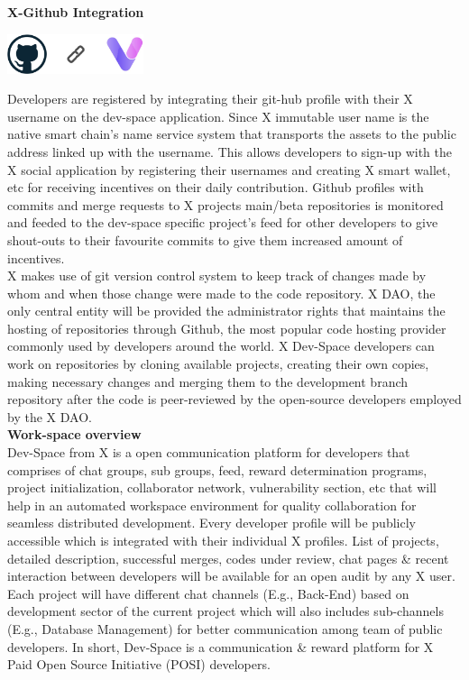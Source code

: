 \documentclass[letterpaper,11pt]{article}
\begin{document}
\textbf{X-Github Integration}\\

\begin{center}
\includegraphics[width=4cm]{git-int}
\end{center}

Developers are registered by integrating their git-hub profile with their X username on the dev-space application. Since X immutable user name is the native smart chain's name service system that transports the assets to the public address linked up with the username. This allows developers to sign-up with the X social application by registering their usernames and creating X smart wallet, etc for receiving incentives on their daily contribution. Github profiles with commits and merge requests to X projects main/beta repositories is monitored and feeded to the dev-space specific project's feed for other developers to give shout-outs to their favourite commits to give them increased amount of incentives.\\

X makes use of git version control system to keep track of changes made by whom and when those change were made to the code repository. X DAO, the only central entity will be provided the administrator rights that maintains the hosting of repositories through Github, the most popular code hosting provider commonly used by developers around the world. X Dev-Space developers can work on repositories by cloning available projects, creating their own copies, making necessary changes and merging them to the development branch repository after the code is peer-reviewed by the open-source developers employed by the X DAO.\\ 

\textbf{Work-space overview}\\

Dev-Space from X is a open communication platform for developers that comprises of chat groups, sub groups, feed, reward determination programs, project initialization, collaborator network, vulnerability section, etc that will help in an automated workspace environment for quality collaboration for seamless distributed development. Every developer profile will be publicly accessible which is integrated with their individual X profiles. List of projects, detailed description, successful merges, codes under review, chat pages \& recent interaction between developers will be available for an open audit by any X user. Each project will have different chat channels (E.g., Back-End) based on development sector of the current project which will also includes sub-channels (E.g., Database Management) for better communication among team of public developers. In short, Dev-Space is a communication \& reward platform for X Paid Open Source Initiative (POSI) developers.\\
\end{document}
